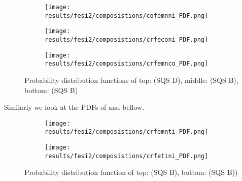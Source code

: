 \begin{figure}[H]
	\centering
	\begin{subfigure}{\textwidth}
		\texttt{[image: results/fesi2/composistions/cofemnni\_PDF.png]}
	\end{subfigure}
	\begin{subfigure}{\textwidth}
		\texttt{[image: results/fesi2/composistions/crfeconi\_PDF.png]}
	\end{subfigure}
	\begin{subfigure}{\textwidth}
		\texttt{[image: results/fesi2/composistions/crfemnco\_PDF.png]}
	\end{subfigure}
	\caption{Probability distribution functions of top:  (SQS D), middle:  (SQS B), bottom:  (SQS B)}
\end{figure}
Similarly we look at the PDFs of  and  bellow.
\begin{figure}[H]
	\centering
	\begin{subfigure}{\textwidth}
		\texttt{[image: results/fesi2/composistions/crfemnti\_PDF.png]}
	\end{subfigure}
	\begin{subfigure}{\textwidth}
		\texttt{[image: results/fesi2/composistions/crfetini\_PDF.png]}
	\end{subfigure}
	\caption{Probability distribution function of top:  (SQS B), bottom:  (SQS B))}
\end{figure}